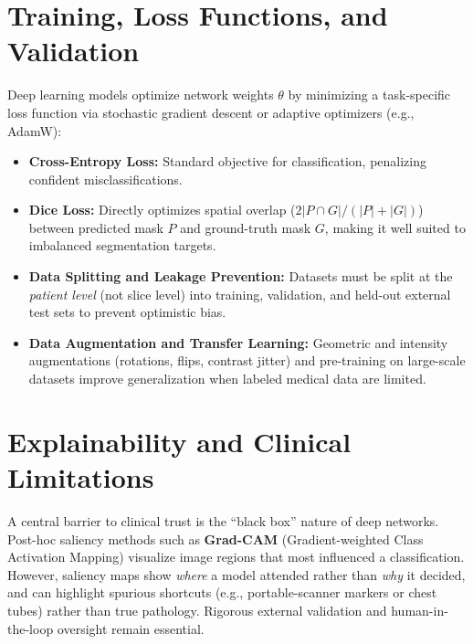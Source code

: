 \section{Training, Loss Functions, and Validation}
Deep learning models optimize network weights $\theta$ by minimizing a task-specific loss function via stochastic gradient descent or adaptive optimizers (e.g., AdamW):
\begin{itemize}
    \item \textbf{Cross-Entropy Loss:} Standard objective for classification, penalizing confident misclassifications.
    \item \textbf{Dice Loss:} Directly optimizes spatial overlap ($2|P \cap G| / (|P| + |G|)$) between predicted mask $P$ and ground-truth mask $G$, making it well suited to imbalanced segmentation targets.
    \item \textbf{Data Splitting and Leakage Prevention:} Datasets must be split at the \emph{patient level} (not slice level) into training, validation, and held-out external test sets to prevent optimistic bias.
    \item \textbf{Data Augmentation and Transfer Learning:} Geometric and intensity augmentations (rotations, flips, contrast jitter) and pre-training on large-scale datasets improve generalization when labeled medical data are limited.
\end{itemize}

\section{Explainability and Clinical Limitations}
A central barrier to clinical trust is the ``black box'' nature of deep networks. Post-hoc saliency methods such as \textbf{Grad-CAM} (Gradient-weighted Class Activation Mapping) visualize image regions that most influenced a classification. However, saliency maps show \emph{where} a model attended rather than \emph{why} it decided, and can highlight spurious shortcuts (e.g., portable-scanner markers or chest tubes) rather than true pathology. Rigorous external validation and human-in-the-loop oversight remain essential.

\clearpage
